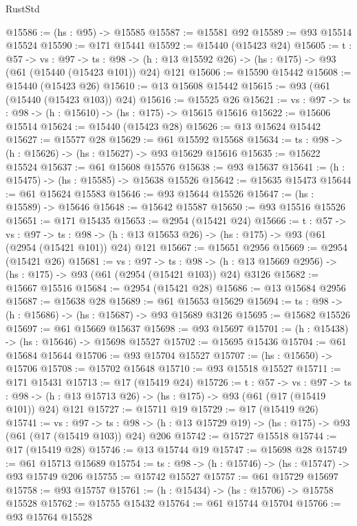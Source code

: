\begin{lexlean}{RustStd}
\begin{coremodule}
@15586 := (hs : @95) -> @15585
@15587 := @15581 @92
@15589 := @93 @15514 @15524
@15590 := @171 @15441
@15592 := @15440 (@15423 @24)
@15605 := {t : @57} ->
  {vs : @97} ->
  {ts : @98} -> (h : @13 @15592 @26) -> (hs : @175) -> @93 (@61 (@15440 (@15423 @101)) @24) @121
@15606 := @15590 @15442
@15608 := @15440 (@15423 @26)
@15610 := @13 @15608 @15442
@15615 := @93 (@61 (@15440 (@15423 @103)) @24)
@15616 := @15525 @26
@15621 := {vs : @97} -> {ts : @98} -> (h : @15610) -> (hs : @175) -> @15615 @15616
@15622 := @15606 @15514
@15624 := @15440 (@15423 @28)
@15626 := @13 @15624 @15442
@15627 := @15577 @28
@15629 := @61 @15592 @15568
@15634 := {ts : @98} -> (h : @15626) -> (hs : @15627) -> @93 @15629 @15616
@15635 := @15622 @15524
@15637 := @61 @15608 @15576
@15638 := @93 @15637
@15641 := (h : @15475) -> (hs : @15585) -> @15638 @15526
@15642 := @15635 @15473
@15644 := @61 @15624 @15583
@15646 := @93 @15644 @15526
@15647 := (hs : @15589) -> @15646
@15648 := @15642 @15587
@15650 := @93 @15516 @15526
@15651 := @171 @15435
@15653 := @2954 (@15421 @24)
@15666 := {t : @57} ->
  {vs : @97} ->
  {ts : @98} -> (h : @13 @15653 @26) -> (hs : @175) -> @93 (@61 (@2954 (@15421 @101)) @24) @121
@15667 := @15651 @2956
@15669 := @2954 (@15421 @26)
@15681 := {vs : @97} ->
  {ts : @98} -> (h : @13 @15669 @2956) -> (hs : @175) -> @93 (@61 (@2954 (@15421 @103)) @24) @3126
@15682 := @15667 @15516
@15684 := @2954 (@15421 @28)
@15686 := @13 @15684 @2956
@15687 := @15638 @28
@15689 := @61 @15653 @15629
@15694 := {ts : @98} -> (h : @15686) -> (hs : @15687) -> @93 @15689 @3126
@15695 := @15682 @15526
@15697 := @61 @15669 @15637
@15698 := @93 @15697
@15701 := (h : @15438) -> (hs : @15646) -> @15698 @15527
@15702 := @15695 @15436
@15704 := @61 @15684 @15644
@15706 := @93 @15704 @15527
@15707 := (hs : @15650) -> @15706
@15708 := @15702 @15648
@15710 := @93 @15518 @15527
@15711 := @171 @15431
@15713 := @17 (@15419 @24)
@15726 := {t : @57} ->
  {vs : @97} ->
  {ts : @98} -> (h : @13 @15713 @26) -> (hs : @175) -> @93 (@61 (@17 (@15419 @101)) @24) @121
@15727 := @15711 @19
@15729 := @17 (@15419 @26)
@15741 := {vs : @97} ->
  {ts : @98} -> (h : @13 @15729 @19) -> (hs : @175) -> @93 (@61 (@17 (@15419 @103)) @24) @206
@15742 := @15727 @15518
@15744 := @17 (@15419 @28)
@15746 := @13 @15744 @19
@15747 := @15698 @28
@15749 := @61 @15713 @15689
@15754 := {ts : @98} -> (h : @15746) -> (hs : @15747) -> @93 @15749 @206
@15755 := @15742 @15527
@15757 := @61 @15729 @15697
@15758 := @93 @15757
@15761 := (h : @15434) -> (hs : @15706) -> @15758 @15528
@15762 := @15755 @15432
@15764 := @61 @15744 @15704
@15766 := @93 @15764 @15528

\end{coremodule}
\end{lexlean}
